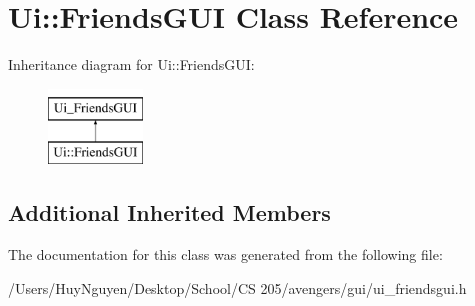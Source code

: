 \hypertarget{classUi_1_1FriendsGUI}{}\section{Ui\+:\+:Friends\+G\+UI Class Reference}
\label{classUi_1_1FriendsGUI}
Inheritance diagram for Ui\+:\+:Friends\+G\+UI\+:\begin{figure}[H]
\begin{center}
\leavevmode
\includegraphics[height=2.000000cm]{classUi_1_1FriendsGUI}
\end{center}
\end{figure}
\subsection*{Additional Inherited Members}


The documentation for this class was generated from the following file\+:\begin{DoxyCompactItemize}
\item 
/\+Users/\+Huy\+Nguyen/\+Desktop/\+School/\+C\+S 205/avengers/gui/ui\+\_\+friendsgui.\+h\end{DoxyCompactItemize}
